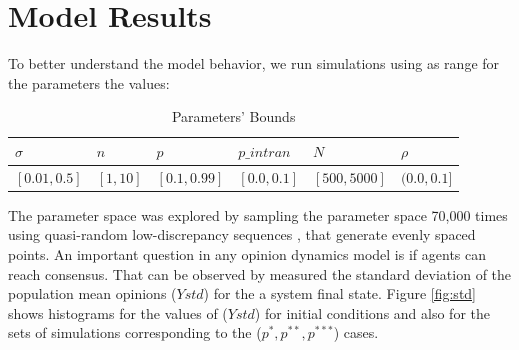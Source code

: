 \documentclass{article}
\begin{document}
  \section{Model Results}

  To better understand the model behavior, we run simulations using as range for the parameters the values:  

  \begin{table}[H]
    \centering
\begin{tabular}{@{}|l|l|l|l|l|l|@{}}
\toprule
\rowcolor[HTML]{EFEFEF} 
$\sigma$ & $n$ & $p$ & $p\_intran$ & $N$ & $\rho$ \\ \midrule
$[0.01, 0.5]$ & $[1, 10]$  & $[0.1, 0.99]$ & $[0.0, 0.1]$ & $[500, 5000]$ & $(0.0, 0.1]$ \\ \bottomrule
\end{tabular}
\caption{Parameters' Bounds}
\end{table}


The parameter space was explored by sampling the parameter space 70,000 times using
quasi-random low-discrepancy sequences \cite{saltelli2008global}, that generate
evenly spaced points. An important question in any opinion dynamics model is if agents can reach consensus.
That can be observed by measured the standard deviation of the population mean opinions (\(Ystd\)) for the
a system final state. Figure \ref{fig:std} shows histograms for the values of (\(Ystd\)) for initial 
conditions and also for the sets of simulations corresponding to the (\(p^{*}, p^{**}, p^{***}\))  cases.
\end{document}

